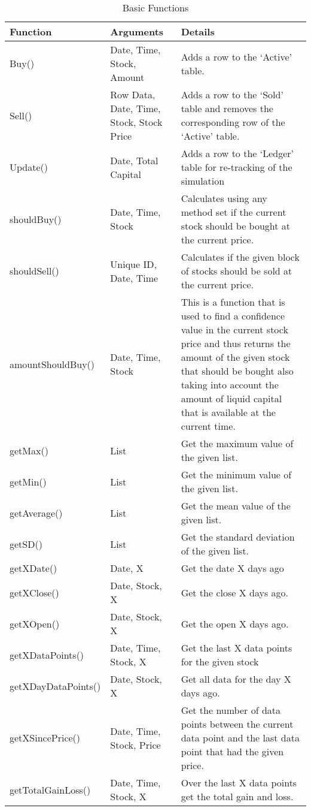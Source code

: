 \documentclass[conference]{IEEEtran}
\begin{document}
\begin{table*}
\centering
\label{units}
\begin{tabu}{ |p{4cm}|p{4cm}|p{6cm}| }\hline\hline
Function & Arguments & Details \\ \hline
Buy() & Date, Time, Stock, Amount & Adds a row to the `Active' table.  \\ \hline
Sell() & Row Data, Date, Time, Stock, Stock Price & Adds a row to the `Sold' table and removes the corresponding row of the `Active' table.  \\ \hline
Update() & Date, Total Capital & Adds a row to the `Ledger' table for re-tracking of the simulation  \\ \hline
shouldBuy() & Date, Time, Stock & Calculates using any method set if the current stock should be bought at the current price.  \\ \hline
shouldSell() & Unique ID, Date, Time & Calculates if the given block of stocks should be sold at the current price.  \\ \hline
amountShouldBuy() & Date, Time, Stock & This is a function that is used to find a confidence value in the current stock price and thus returns the amount of the given stock that should be bought also taking into account the amount of liquid capital that is available at the current time.  \\ \hline
getMax() & List & Get the maximum value of the given list.  \\ \hline
getMin() & List & Get the minimum value of the given list.  \\ \hline
getAverage() & List & Get the mean value of the given list. \\ \hline
getSD() & List & Get the standard deviation of the given list.  \\ \hline
getXDate() & Date, X & Get the date X days ago  \\ \hline
getXClose() & Date, Stock, X & Get the close X days ago.  \\ \hline
getXOpen() & Date, Stock, X & Get the open X days ago.  \\ \hline
getXDataPoints() & Date, Time, Stock, X & Get the last X data points for the given stock  \\ \hline
getXDayDataPoints() & Date, Stock, X & Get all data for the day X days ago. \\ \hline
getXSincePrice() & Date, Time, Stock, Price & Get the number of data points between the current data point and the last data point that had the given price.  \\ \hline
getTotalGainLoss() & Date, Time, Stock, X &  Over the last X data points get the total gain and loss. \\ \hline
\end{tabu}
\vspace{2 mm}
\caption{Basic Functions}
\end{table*}
\end{document}
